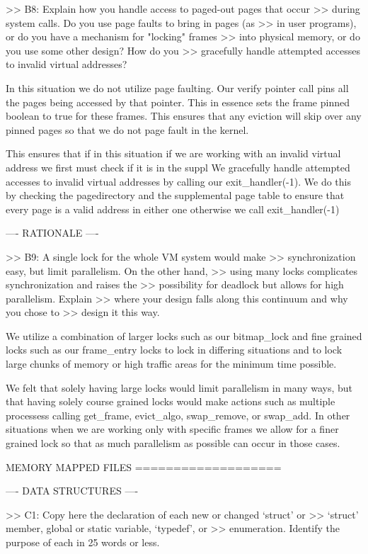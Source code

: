>> B8: Explain how you handle access to paged-out pages that occur
>> during system calls.  Do you use page faults to bring in pages (as
>> in user programs), or do you have a mechanism for "locking" frames
>> into physical memory, or do you use some other design?  How do you
>> gracefully handle attempted accesses to invalid virtual addresses?

In this situation we do not utilize page faulting. Our verify pointer call
pins all the pages being accessed by that pointer. This in essence sets the
frame pinned boolean to true for these frames. This ensures that any eviction
will skip over any pinned pages so that we do not page fault in the kernel.

This ensures that if in this situation if we are working with an invalid
virtual address we first must check if it is in the suppl
We gracefully handle attempted accesses to invalid virtual addresses by
calling our exit_handler(-1). We do this by checking the pagedirectory
and the supplemental page table to ensure that every page is a valid
address in either one otherwise we call exit_handler(-1)


---- RATIONALE ----

>> B9: A single lock for the whole VM system would make
>> synchronization easy, but limit parallelism.  On the other hand,
>> using many locks complicates synchronization and raises the
>> possibility for deadlock but allows for high parallelism.  Explain
>> where your design falls along this continuum and why you chose to
>> design it this way.

We utilize a combination of larger locks such as our bitmap_lock and
fine grained locks such as our frame_entry locks to lock in differing
situations and to lock large chunks of memory or high traffic areas 
for the minimum time possible. 

We felt that solely having large locks would limit parallelism in many ways, 
but that having solely course grained locks would make actions such as multiple
processess calling get_frame, evict_algo, swap_remove, or swap_add. In other
situations when we are working only with specific frames we allow for a finer
grained lock so that as much parallelism as possible can occur in those cases.

             MEMORY MAPPED FILES
             ===================

---- DATA STRUCTURES ----

>> C1: Copy here the declaration of each new or changed `struct' or
>> `struct' member, global or static variable, `typedef', or
>> enumeration.  Identify the purpose of each in 25 words or less.

